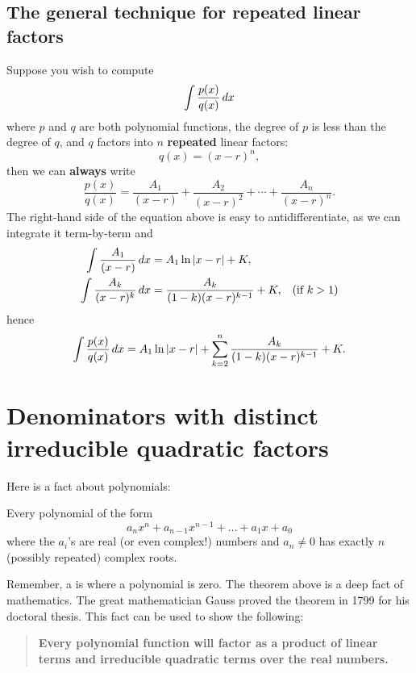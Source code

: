 \documentclass{ximera}
\begin{document}
\subsection{The general technique for repeated linear factors}

Suppose you wish to compute
\[
\int \frac{p(x)}{q(x)} \mathop{}\!d x
\]
where $p$ and $q$ are both polynomial functions, the degree of $p$ is
less than the degree of $q$, and $q$ factors into $n$
\textbf{repeated} linear factors:
\[
q(x) = (x-r)^n,
\]
then we can \textbf{always} write
\[
\frac{p(x)}{q(x)}  = \frac{A_1}{(x-r)} + \frac{A_2}{(x-r)^2} + \cdots + \frac{A_n}{(x-r)^n}. 
\]
The right-hand side of the equation above is easy to
antidifferentiate, as we can integrate it term-by-term and
\begin{align*}
  \int \frac{A_1}{(x-r)} \mathop{}\!d x &= A_1 \ln|x-r| + K,\\
  \int \frac{A_k}{(x-r)^k} \mathop{}\!d x &= \frac{A_k}{(1-k)(x-r)^{k-1}}+ K, &\text{(if $k>1$)}
\end{align*}
hence
\[
\int \frac{p(x)}{q(x)} \mathop{}\!d x = A_1 \ln|x-r|  + \sum_{k=2}^n \frac{A_k}{(1-k)(x-r)^{k-1}} + K.
\]






\section{Denominators with distinct irreducible quadratic factors}

Here is a fact about polynomials:

\begin{theorem}
  Every polynomial of the form
  \[
  a_n x^n + a_{n-1} x^{n-1} + \dots + a_1 x + a_0
  \]
  where the $a_i$'s are real (or even complex!) numbers and $a_n \ne 0$ has exactly
  $n$ (possibly repeated) complex roots.
\end{theorem}

Remember, a  is where a polynomial is zero. The theorem
above is a deep fact of mathematics. The great mathematician Gauss
proved the theorem in 1799 for his doctoral thesis. This fact can be
used to show the following:
\begin{quote}
  \textbf{Every polynomial function will factor as a product of linear
    terms and irreducible quadratic terms over the real numbers.}
\end{quote}
\end{document}
